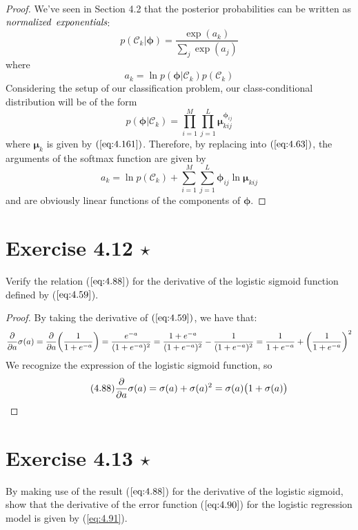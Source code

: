 \begin{proof}
    We've seen in Section 4.2 that the posterior probabilities
    can be written as $\emph{normalized}$ $\emph{exponentials}$:
    \begin{equation}\label{eq:4.62}\tag{4.62}
        p(\mathcal{C}_k | \bm{\phi}) 
        = \frac{\exp(a_k)}{\sum_{j} \exp(a_j)}
    \end{equation}
    where
    \begin{equation}\label{eq:4.63}\tag{4.63}
        a_k = \ln p(\bm{\phi} | \mathcal{C}_k)p(\mathcal{C}_k)
    \end{equation}
    Considering the setup of our classification problem,
    our class-conditional distribution will be of the form
    \[
        p(\bm{\phi} | \mathcal{C}_k) 
        = \prod_{i = 1}^M \prod_{j = 1}^L
            \bm{\mu}_{kij}^{\bm{\phi}_{ij}}
    \] 
    where $\bm{\mu}_k$ is given by $(\ref{eq:4.161})$. 
    Therefore,
    by replacing into $(\ref{eq:4.63})$, the arguments
    of the softmax function are given by
    \[
        a_k = \ln p(\mathcal{C}_k) 
        + \sum_{i=1}^{M} \sum_{j=1}^{L} \bm{\phi}_{ij} \ln \bm{\mu}_{kij} 
    \] 
    and are obviously linear functions of the components
    of $\bm{\phi}$.
\end{proof}

\section*{Exercise 4.12 $\star$}
Verify the relation ($\ref{eq:4.88}$) for the derivative of the logistic sigmoid
function defined by ($\ref{eq:4.59}$).

\vspace{1em}

\begin{proof}
    By taking the derivative of $(\ref{eq:4.59})$, we have that: 
    \[
        \pdv{a} \sigma(a) 
        = \pdv{a}\bigg(\frac{1}{1 + e^{-a}}\bigg)
        = \frac{e^{-a}}{(1 + e^{-a})^2}
        = \frac{1 + e^{-a}}{(1 + e^{-a})^2} - \frac{1}{(1 + e^{-a})^2} 
        = \frac{1}{1 + e^{-a}} + \bigg(\frac{1}{1 + e^{-a}}\bigg)^2
    \] 
    We recognize the expression of the logistic sigmoid function, so
    \begin{equation}\label{eq:4.88}\tag{4.88}
        \pdv{a} \sigma(a) = \sigma(a) + \sigma(a)^2 = \sigma(a) \big(1 + \sigma(a)\big)
    \end{equation}
\end{proof}

\section*{Exercise 4.13 $\star$}
By making use of the result ($\ref{eq:4.88}$) for the derivative of the logistic
sigmoid, show that the derivative of the error function ($\ref{eq:4.90}$) for 
the logistic regression model is given by (\ref{eq:4.91}).

